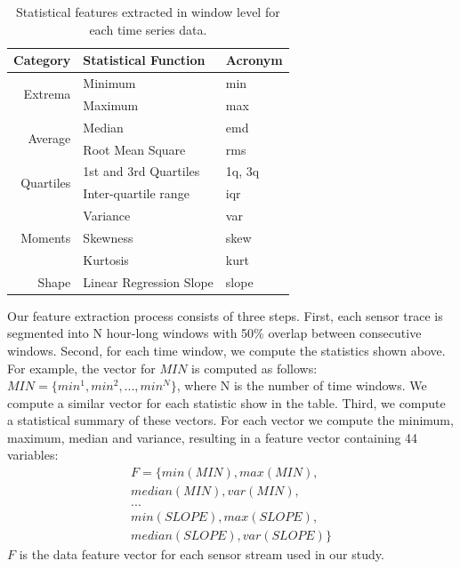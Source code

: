 \begin{table}[h]
\centering
\begin{tabular}{r|l|l}
\hline
Category                   & Statistical Function & \multicolumn{1}{l}{Acronym} \\ \hline\hline
\multirow{2}{*}{Extrema}   & Minimum                 & min                          \\ \cline{3-3}
                           & Maximum                 & max                          \\ \hline
\multirow{2}{*}{Average}   & Median                  & emd                          \\ \cline{3-3}
                           & Root Mean Square        & rms                          \\ \hline
\multirow{2}{*}{Quartiles} & 1st and 3rd Quartiles   & 1q, 3q                       \\ \cline{3-3}
                           & Inter-quartile range    & iqr                          \\ \hline
\multirow{3}{*}{Moments}   & Variance                & var                          \\ \cline{3-3}
                           & Skewness                & skew                         \\ \cline{3-3}
                           & Kurtosis                & kurt                         \\ \hline
Shape                      & Linear Regression Slope & slope                        \\ \hline
\end{tabular}
\caption{Statistical features extracted in window level for each time series data.}
\label{table:fd}
\end{table}

Our feature extraction process consists of three steps.
First, each sensor trace is segmented into N hour-long windows with 50\% overlap between consecutive windows. Second, for each time window, we compute the statistics shown above.
For example, the vector for $MIN$ is computed as follows:
$MIN = \{min^{1}, min^{2}, ..., min^{N}\}$, where N is the number of time windows. We compute a similar vector for each statistic show in the table.
Third, we compute a statistical summary of these vectors. For each vector we compute the minimum, maximum, median and variance, resulting in a feature
vector containing 44 variables:
\begin{displaymath}
\begin{split}
F = \{min(MIN), max(MIN), \\
median(MIN), var(MIN),\\
...\\
min(SLOPE), max(SLOPE), \\
median(SLOPE), var(SLOPE)\}
\end{split}
\end{displaymath}
$F$ is the data feature vector for each sensor stream used in our study.


